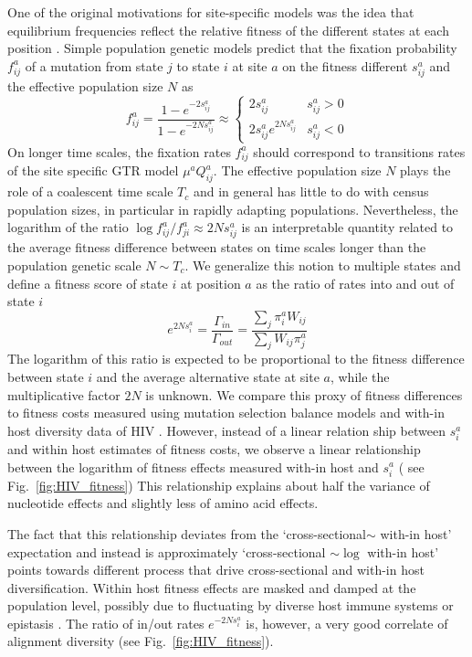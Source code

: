 \documentclass[aps,rmp,twocolumn]{revtex4}
\begin{document}
One of the original motivations for site-specific models was the idea that equilibrium frequencies reflect the relative fitness of the different states at each position \citep{halpern_evolutionary_1998}.
Simple population genetic models predict that the fixation probability $f_{ij}^a$ of a mutation from state $j$ to state $i$ at site $a$ on the fitness different $s^a_{ij}$ and the effective population size $N$ as
\begin{equation}
	f^a_{ij} = \frac{1-e^{-2s^a_{ij}}}{1-e^{-2Ns^a_{ij}}} \approx
	\begin{cases}
		2s^a_{ij} & s^a_{ij}>0 \\
		2s^a_{ij} e^{2Ns^a_{ij}} & s^a_{ij} < 0
	\end{cases}
\end{equation}
On longer time scales, the fixation rates $f^a_{ij}$ should correspond to transitions rates of the site specific GTR model $\mu^a Q^a_{ij}$.
The effective population size $N$ plays the role of a coalescent time scale $T_c$ and in general has little to do with census population sizes, in particular in rapidly adapting populations.
Nevertheless, the logarithm of the ratio $\log f^a_{ij}/f^a_{ji} \approx 2Ns^a_{ij}$ is an interpretable quantity related to the average fitness difference between states on time scales longer than the population genetic scale $N\sim T_c$.
We generalize this notion to multiple states and define a fitness score of state $i$ at position $a$ as the ratio of rates into and out of state $i$
\begin{equation}
	e^{2N s_i^a} = \frac{\Gamma_{in}}{\Gamma_{out}} = \frac{\sum_j \pi_i^a W_{ij}}{\sum_j W_{ij}\pi_j^a}
\end{equation}
The logarithm of this ratio is expected to be proportional to the fitness difference between state $i$ and the average alternative state at site $a$, while the multiplicative factor $2N$ is unknown.
We compare this proxy of fitness differences to fitness costs measured using mutation selection balance models and with-in host diversity data of HIV \citep{zanini2017vivo}.
However, instead of a linear relation ship between $s_i^a$ and within host estimates of fitness costs, we observe a linear relationship between the logarithm of fitness effects measured with-in host and $s_i^a$ (
see Fig.~\ref{fig:HIV_fitness})
This relationship explains about half the variance of nucleotide effects and slightly less of amino acid effects.

The fact that this relationship deviates from the `cross-sectional$\sim$ with-in host' expectation and instead is approximately `cross-sectional $\sim \log$ with-in host' points towards different process that drive cross-sectional and with-in host diversification.
Within host fitness effects are masked and damped at the population level, possibly due to fluctuating by diverse host immune systems or epistasis \citep{zanini2015population,shekhar_spin_2013}.
The ratio of in/out rates $e^{-2Ns_i^a}$ is, however, a very good correlate of alignment diversity (see Fig.~\ref{fig:HIV_fitness}).
\end{document}
